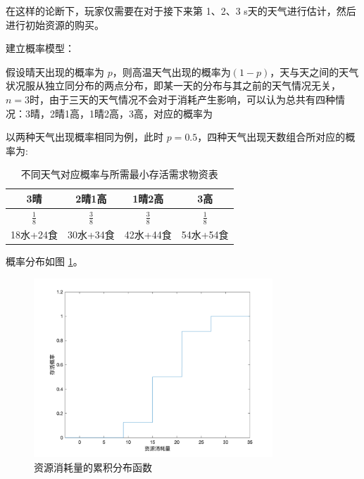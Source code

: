 \documentclass[a4paper]{ctexart}
\begin{document}
在这样的论断下，玩家仅需要在对于接下来第 1、2、3 s天的天气进行估计，然后进行初始资源的购买。

建立概率模型：

假设晴天出现的概率为 $p$，则高温天气出现的概率为$(1-p)$，天与天之间的天气状况服从独立同分布的两点分布，即某一天的分布与其之前的天气情况无关，$n=3$时，由于三天的天气情况不会对于消耗产生影响，可以认为总共有四种情况：3晴，2晴1高，1晴2高，3高，对应的概率为

以两种天气出现概率相同为例，此时 $p=0.5$，四种天气出现天数组合所对应的概率为:
\begin{table}

\centering

\begin{tabular}{c |c | c | c }
    
      3晴 & 2晴1高 & 1晴2高 & 3高   \\
    \hline
    \hline
      $\frac{1}{8}$ & $\frac{3}{8}$ & $\frac{3}{8}$ & $\frac{1}{8}$ \\
     \hline 
     \hline
     18水+24食 & 30水+34食 &  42水+44食 &  54水+54食 \\

\end{tabular}

\caption{不同天气对应概率与所需最小存活需求物资表}

\end{table}

概率分布如图 \ref{fig:cdf}。

\begin{figure}[htpb]
    \centering
    \includegraphics[width=0.8\textwidth]{./pictures/probability.png}
    \caption{资源消耗量的累积分布函数}
    \label{fig:cdf}
\end{figure}
\end{document}

